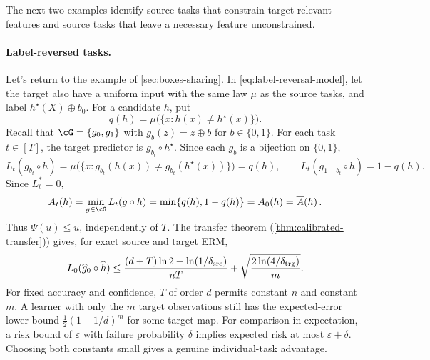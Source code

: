 \documentclass[11pt,twoside]{article}
\theoremstyle{definition}
\theoremstyle{remark}
\begin{document}
The next two examples identify source tasks that constrain target-relevant
features and source tasks that leave a necessary feature unconstrained.

\paragraph{Label-reversed tasks.}
Let's return to the example of \cref{sec:boxes-sharing}.
In \cref{eq:label-reversal-model}, let the target also have a uniform input
with the same law $\mu$ as the source tasks, and label $h^\star(X)\oplus b_0$.
For a candidate $h$, put
\[
 q(h)=\mu\bigl(\{x:h(x)\ne h^\star(x)\}\bigr).
\]
Recall that $\cG=\{g_0,g_1\}$ with $g_b(z)=z\oplus b$ for $b\in\{0,1\}$.
For each task $t\in[T]$, the target predictor is $g_{b_t}\circ h^\star$.
Since each $g_b$ is a bijection on $\{0,1\}$,
\[
 L_t(g_{b_t}\circ h)
 =\mu\bigl(\{x:g_{b_t}(h(x))\ne g_{b_t}(h^\star(x))\}\bigr)
 =q(h),
 \qquad
 L_t(g_{1-b_t}\circ h)=1-q(h).
\]
Since $L_t^* = 0$,
\begin{equation}
 A_t(h)=\min_{g\in \cG} L_t(g \circ h) =
 \min\{q(h),1-q(h)\}=A_0(h)=\overline A(h)\,.
 \label{eq:boxes-calibration}
\end{equation}
Thus $\Psi(u)\le u$, independently of $T$. The transfer theorem (\cref{thm:calibrated-transfer})) gives, for
exact source and target ERM,
\begin{equation}
 L_0(\widehat g_0\circ\widehat h)
 \le
 \frac{(d+T)\ln2+\ln(1/\delta_{\rm src})}{nT}
 +\sqrt{\frac{2\ln(4/\delta_{\rm trg})}m}.
 \label{eq:boxes-transfer}
\end{equation}
For fixed accuracy and confidence, $T$ of order $d$ permits constant $n$
and constant $m$. A learner with only the $m$ target observations still has
the expected-error lower bound $\frac12(1-1/d)^m$ for some target map.
For comparison in expectation, a risk bound of $\varepsilon$ with failure
probability $\delta$ implies expected risk at most $\varepsilon+\delta$.
Choosing both constants small gives a genuine individual-task advantage.
\end{document}
